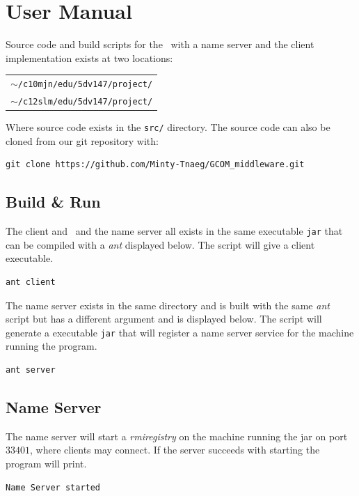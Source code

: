 \section{User Manual}
Source code and build scripts for the \mw\ with a name server and the client implementation exists at two locations:

\begin{tabular}{l}
	$\sim$\texttt{/c10mjn/edu/5dv147/project/}\\
	$\sim$\texttt{/c12slm/edu/5dv147/project/}\\
\end{tabular}

Where source code exists in the \texttt{src/} directory. The source code can also be cloned from our git repository with:

\begin{verbatim}
git clone https://github.com/Minty-Tnaeg/GCOM_middleware.git
\end{verbatim}

\subsection{Build \& Run}
The client and \mw\ and the name server all exists in the same executable \texttt{jar} that can be compiled with a \textit{ant} displayed below. The script will give a client executable.

\begin{verbatim}
ant client
\end{verbatim}

The name server exists in the same directory and is built with the same \textit{ant} script but has a different argument and is displayed below. The script will generate a executable \texttt{jar} that will register a name server service for the machine running the program.

\begin{verbatim}
ant server
\end{verbatim}

\subsection{Name Server}
The name server will start a \textit{rmiregistry} on the machine running the jar on port $33401$, where clients may connect. If the server succeeds with starting the program will print.

\begin{verbatim}
Name Server started
\end{verbatim}


